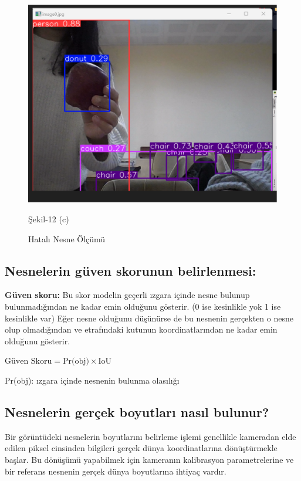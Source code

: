 \documentclass[11pt,a4paper]{report}
\begin{document}
\begin{figure}[!h]
	\vspace{1cm} %
	
	\begin{minipage}{\textwidth} %
		\centering
		\includegraphics[width=0.5\linewidth]{nesne tanıma-3}
		\caption*{Şekil-12 (c)}
		\label{boyutbulma3}
	\end{minipage}
	
	\caption{Hatalı Nesne Ölçümü} %
	\label{el-nesne-boyutlar}
\end{figure}
	
	\newpage
	\subsection{Nesnelerin güven skorunun belirlenmesi:}
	\textbf{Güven skoru:} Bu skor modelin geçerli ızgara içinde nesne bulunup bulunmadığından ne kadar emin olduğunu gösterir. (0 ise kesinlikle yok 1 ise kesinlikle var) Eğer nesne olduğunu düşünürse de bu nesnenin gerçekten o nesne olup olmadığından ve etrafındaki kutunun koordinatlarından ne kadar emin olduğunu gösterir\cite{picskin2016opencv}.
	\newline
	
	$ \text{Güven Skoru} = \text{Pr(obj)} \times \text{IoU} $
	\newline
	
	Pr(obj): ızgara içinde nesnenin bulunma olasılığı
	
		\subsection{Nesnelerin gerçek boyutları nasıl bulunur?}
	
	Bir görüntüdeki nesnelerin boyutlarını belirleme işlemi genellikle kameradan elde edilen piksel cinsinden bilgileri gerçek dünya koordinatlarına dönüştürmekle başlar. Bu dönüşümü yapabilmek için kameranın kalibrasyon parametrelerine ve bir referans nesnenin gerçek dünya boyutlarına ihtiyaç vardır.
	
\end{document}

